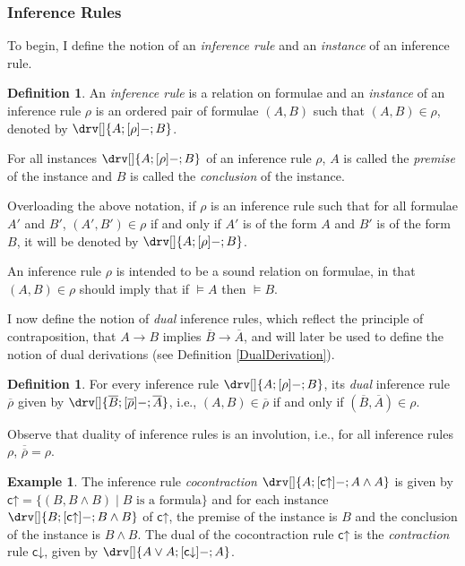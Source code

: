 \documentclass[10pt]{article}
\theoremstyle{definition}\newtheorem{remark}[theorem]{Remark}
\theoremstyle{definition}\newtheorem{example}[theorem]{Example}
\theoremstyle{definition}\newtheorem{definition}[theorem]{Definition}
\newcommand{\cUp}{{\mathsf{c\mathord\uparrow}}}
\newcommand{\cDown}{{\mathsf{c\mathord\downarrow}}}
\begin{document}
	\subsubsection*{Inference Rules}
	
	To begin, I define the notion of an \textit{inference rule} and an \textit{instance} of an inference rule.
	
	\begin{definition}
		An \textit{inference rule} is a relation on formulae and an \textit{instance} of an inference rule $\rho$ is an ordered pair of formulae $(A, B)$ such that $(A, B) \in \rho$, denoted by $\drv[] {A ; [\rho]- ; B}$.
		
		For all instances $\drv[] {A ; [\rho]- ; B}$ of an inference rule $\rho$, $A$ is called the \textit{premise} of the instance and $B$ is called the \textit{conclusion} of the instance.
	\end{definition}

	Overloading the above notation, if $\rho$ is an inference rule such that for all formulae $A'$ and $B'$, $(A', B') \in \rho$ if and only if $A'$ is of the form $A$ and $B'$ is of the form $B$, it will be denoted by $\drv[] {A ; [\rho]- ; B}$.
	
	An inference rule $\rho$ is intended to be a sound relation on formulae, in that $(A, B) \in \rho$ should imply that if $\models A$ then $\models B$.

	I now define the notion of \textit{dual} inference rules, which reflect the principle of contraposition, that $A \rightarrow B$ implies $\overline{B} \rightarrow \overline{A}$, and will later be used to define the notion of dual derivations (see Definition \ref{DualDerivation}).
	
	\begin{definition}
		For every inference rule $\drv[] {A ; [\rho]- ; B}$, its \textit{dual} inference rule $\overline{\rho}$ given by $\drv[] {\overline{B} ; [\overline{\rho}]- ; \overline{A}}$, i.e., $(A, B) \in \overline{\rho}$ if and only if $(\overline{B}, \overline{A}) \in \rho$.
	\end{definition}

	Observe that duality of inference rules is an involution, i.e., for all inference rules $\rho$, $\overline{\overline{\rho}} = \rho$.
	
	\begin{example}
		The inference rule \textit{cocontraction} $\drv[] {A ; [\cUp]- ; A \land A}$ is given by $\cUp = \{(B, B \land B) \mid \text{$B$ is a formula}\}$ and for each instance $\drv[] {B ; [\cUp]- ; B \land B}$ of $\cUp$, the premise of the instance is $B$ and the conclusion of the instance is $B \land B$. The dual of the cocontraction rule $\cUp$ is the \textit{contraction} rule $\cDown$, given by $\drv[] {A \lor A ; [\cDown]- ; A}$.
	\end{example}
	
\end{document}
